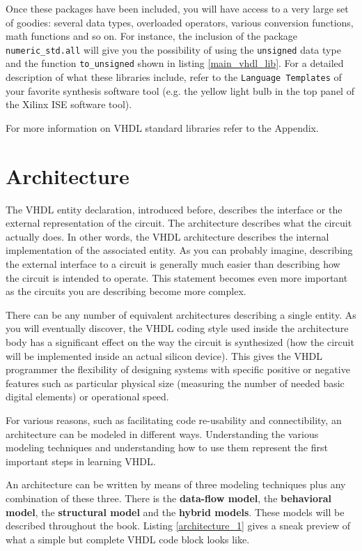 Once these packages have been included, you will have access to a very large set of goodies: several data types, overloaded operators, various conversion functions, math functions and so on. For instance, the inclusion of the package \texttt{numeric\_std.all} will give you the possibility of using the \texttt{unsigned} data type and the function \texttt{to\_unsigned} shown in listing \ref{main_vhdl_lib}. For a detailed description of what these libraries include, refer to the \texttt{Language Templates} of your favorite synthesis software tool (e.g. the yellow light bulb in the top panel of the Xilinx ISE software tool).

For more information on VHDL standard libraries refer to the Appendix.

\section{Architecture}
The VHDL entity declaration, introduced before, describes the interface or the external representation of the circuit. The architecture describes what the circuit actually does. In other words, the VHDL architecture describes the internal implementation of the associated entity. As you can probably imagine, describing the external interface to a circuit is generally much easier than describing how the circuit is intended to operate. This statement becomes even more important as the circuits you are describing become more complex.

There can be any number of equivalent architectures describing a single entity. As you will eventually discover, the VHDL coding style used inside the architecture body has a significant effect on the way the circuit is synthesized (how the circuit will be implemented inside an actual silicon device). This gives the VHDL programmer the flexibility of designing systems with specific positive or negative features such as particular physical size (measuring the number of needed basic digital elements) or operational speed.

For various reasons, such as facilitating code re-usability and connectibility, an architecture can be modeled in different ways. Understanding the various modeling techniques and understanding how to use them represent the first important steps in learning VHDL.

An architecture can be written by means of three modeling techniques plus any combination of these three. There is the \textbf{data-flow model}, the \textbf{behavioral model}, the \textbf{structural model} and the \textbf{hybrid models}. These models will be described throughout the book. Listing \ref{architecture_1} gives a sneak preview of what a simple but complete VHDL code block looks like.

